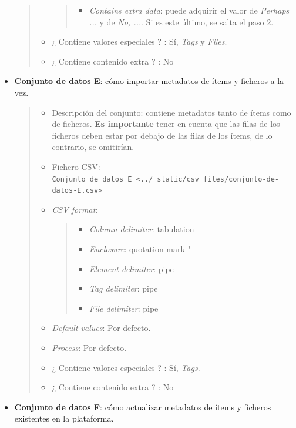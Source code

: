 \documentclass[
]{article}
\providecommand{\tightlist}{%
  \setlength{\itemsep}{0pt}\setlength{\parskip}{0pt}}
\begin{document}
\begin{itemize}
\begin{quote}
\begin{itemize}
    \begin{quote}
    \begin{itemize}
    \tightlist
    \item
      \emph{Contains extra data}: puede adquirir el valor de
      \emph{Perhaps ...} y de \emph{No, ...}. Si es este último, se
      salta el paso 2.
    \end{itemize}
    \end{quote}
  \item
    ¿ Contiene valores especiales ? : Sí, \emph{Tags} y \emph{Files}.
  \item
    ¿ Contiene contenido extra ? : No
  \end{itemize}
  \end{quote}
\item
  \textbf{Conjunto de datos E}: cómo importar metadatos de ítems y
  ficheros a la vez.

  \begin{quote}
  \begin{itemize}
  \item
    Descripción del conjunto: contiene metadatos tanto de ítems como de
    ficheros. \textbf{Es importante} tener en cuenta que las filas de
    los ficheros deben estar por debajo de las filas de los ítems, de lo
    contrario, se omitirían.
  \item
    Fichero CSV:
    \texttt{Conjunto\ de\ datos\ E\ \textless{}../\_static/csv\_files/conjunto-de-datos-E.csv\textgreater{}}
  \item
    \emph{CSV format}:

    \begin{quote}
    \begin{itemize}
    \tightlist
    \item
      \emph{Column delimiter}: tabulation
    \item
      \emph{Enclosure}: quotation mark "
    \item
      \emph{Element delimiter}: pipe
    \item
      \emph{Tag delimiter}: pipe
    \item
      \emph{File delimiter}: pipe
    \end{itemize}
    \end{quote}
  \item
    \emph{Default values}: Por defecto.
  \item
    \emph{Process}: Por defecto.
  \item
    ¿ Contiene valores especiales ? : Sí, \emph{Tags}.
  \item
    ¿ Contiene contenido extra ? : No
  \end{itemize}
  \end{quote}
\item
  \textbf{Conjunto de datos F}: cómo actualizar metadatos de ítems y
  ficheros existentes en la plataforma.


\end{itemize}
\end{document}

